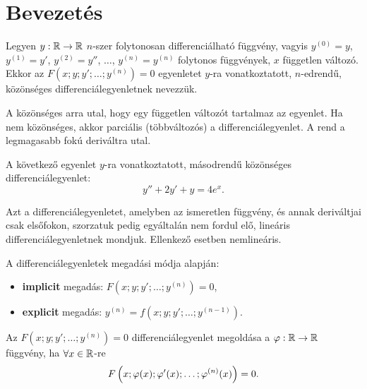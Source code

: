 \clearpage
\section{Bevezetés}

\begin{definition}[Differenciálegyenlet]
  Legyen $y : \mathbb{R} \rightarrow \mathbb{R}$ $n$-szer folytonosan differenciálható
  függvény, vagyis $y^{(0)} = y$, $y^{(1)} = y'$, $y^{(2)} = y''$, $\dots$,
  $y^{(n)} = y^{(n)}$ folytonos függvények, $x$ független változó. Ekkor az
  $F \left( x ; y ; y' ; \dots ; y^{(n)} \right) = 0$ egyenletet $y$-ra
  vonatkoztatott, $n$-edrendű, közönséges differenciálegyenletnek nevezzük.
\end{definition}

\begin{note}
  A közönséges arra utal, hogy egy független változót tartalmaz az egyenlet.
  Ha nem közönséges, akkor parciális (többváltozós) a differenciálegyenlet.
  A rend a legmagasabb fokú deriváltra utal.
\end{note}

\begin{example}
  A következő egyenlet $y$-ra vonatkoztatott, másodrendű közönséges
  differenciálegyenlet:
  $$
    y'' + 2y' + y = 4e^x.
  $$
\end{example}

\begin{definition}
  Azt a differenciálegyenletet, amelyben az ismeretlen függvény, és annak
  deriváltjai csak elsőfokon, szorzatuk pedig egyáltalán nem fordul elő,
  lineáris differenciálegyenletnek mondjuk. Ellenkező esetben nemlineáris.
\end{definition}

\begin{note}
  A differenciálegyenletek megadási módja alapján:
  \begin{itemize}
    \item \textbf{implicit} megadás:
          $F \left( x ; y ; y' ; \dots ; y^{(n)} \right) = 0$,

    \item \textbf{explicit} megadás:
          $y^{(n)} = f(x; y; y'; \dots; y^{(n-1)})$.
  \end{itemize}
\end{note}

\begin{definition}
  Az $F \left( x ; y ; y' ; \dots ; y^{(n)} \right) = 0$ differenciálegyenlet
  megoldása a $\varphi : \mathbb{R} \rightarrow \mathbb{R}$ függvény, ha
  $\forall x \in \mathbb{R}$-re
  $$
    F \left( x ; \varphi(x) ; \varphi'(x) ; \dots ; \varphi^{(n)}(x) \right) = 0
    \text.
  $$
\end{definition}

